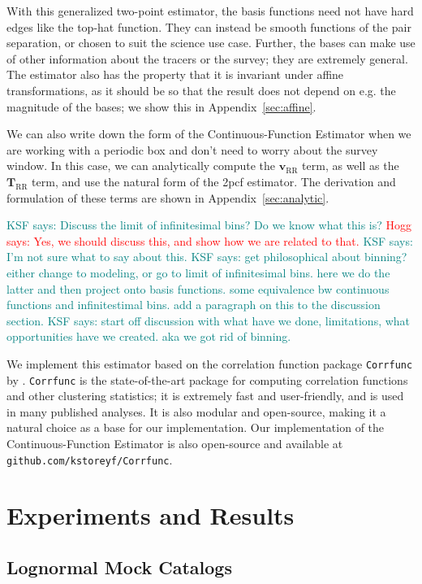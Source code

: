 \documentclass[modern]{aastex62}
\newcommand{\cf}{2pcf\xspace} %
\newcommand{\est}{the Continuous-Function Estimator\xspace}
\newcommand{\bld}[1]{\bm{#1}} %
\newcommand{\vv}[1]{\bld{v}_\mathrm{#1}}
\newcommand{\TT}[1]{\bld{T}_\mathrm{#1}}
\newcommand{\KSF}[1]{\textcolor{teal}{KSF says: #1}}
\newcommand{\hogg}[1]{\textcolor{red}{Hogg says: #1}}
\begin{document}
With this generalized two-point estimator, the basis functions need not have hard edges like the top-hat function.
They can instead be smooth functions of the pair separation, or chosen to suit the science use case.
Further, the bases can make use of other information about the tracers or the survey; they are extremely general.
The estimator also has the property that it is invariant under affine transformations, as it should be so that the result does not depend on e.g. the magnitude of the bases; we show this in Appendix~\ref{sec:affine}.

We can also write down the form of \est when we are working with a periodic box and don't need to worry about the survey window.
In this case, we can analytically compute the $\vv{RR}$ term, as well as the $\TT{RR}$ term, and use the natural form of the \cf estimator.
The derivation and formulation of these terms are shown in Appendix~\ref{sec:analytic}.

\KSF{Discuss the limit of infinitesimal bins? Do we know what this is?} \hogg{Yes, we should discuss this, and show how we are related to that.} \KSF{I'm not sure what to say about this.}
\KSF{get philosophical about binning? either change to modeling, or go to limit of infinitesimal bins. here we do the latter and then project onto basis functions. some equivalence bw continuous functions and infinitestimal bins. add a paragraph on this to the discussion section.}
\KSF{start off discussion with what have we done, limitations, what opportunities have we created. aka we got rid of binning.}

We implement this estimator based on the correlation function package \texttt{Corrfunc} by \cite{Sinha2019}.
\texttt{Corrfunc} is the state-of-the-art package for computing correlation functions and other clustering statistics; it is extremely fast and user-friendly, and is used in many published analyses.
It is also modular and open-source, making it a natural choice as a base for our implementation.
Our implementation of \est is also open-source and available at \texttt{github.com/kstoreyf/Corrfunc}.


\section{Experiments and Results}
\label{sec:experiments}

\subsection{Lognormal Mock Catalogs}
\end{document}

